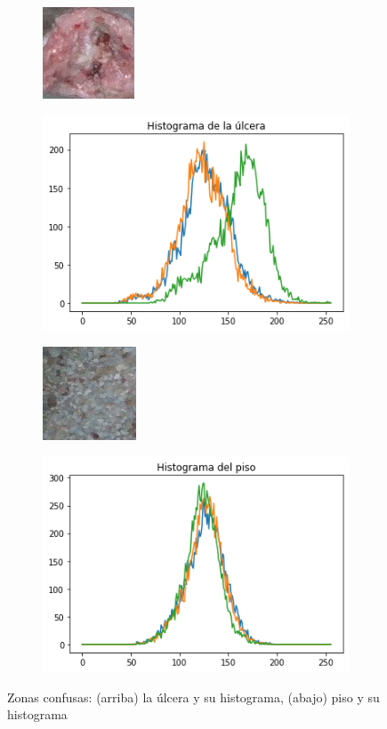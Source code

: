 \begin{figure}
	\centering
	\begin{subfigure}
		\centering
		\includegraphics[width=.3\linewidth]{./Graphics/expdfu.jpg}
	\end{subfigure}
	\begin{subfigure}
		\centering
		\includegraphics[width=.5\linewidth]{./Graphics/histDFU.png}
	\end{subfigure}
	\begin{subfigure}
		\centering
		\includegraphics[width=.3\linewidth]{./Graphics/floor.jpg}
	\end{subfigure}
	\begin{subfigure}
		\centering
		\includegraphics[width=.5\linewidth]{./Graphics/histFloor.png}
	\end{subfigure}
	\caption{Zonas confusas: (arriba) la úlcera y su histograma, (abajo) piso y su histograma}
	\label{fig:confussion}
\end{figure}

